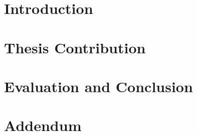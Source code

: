 \documentclass[headsepline,footsepline,footinclude=false,oneside,fontsize=11pt,paper=a4,listof=totoc,bibliography=totoc]{scrbook} %
\begin{document}
 

\frontmatter{}





\tableofcontents{}

\mainmatter{}


\part{Introduction}




\part{Thesis Contribution}




\part{Evaluation and Conclusion}


\part{Addendum}
\begin{appendices}


\end{appendices}


\listoffigures{}
\listoftables{}
\printbibliography{}
\end{document}
